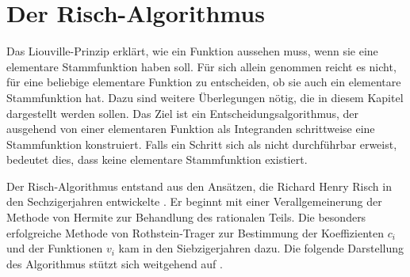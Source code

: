 %
%
%
\section{Der Risch-Algorithmus
\label{buch:intalg:section:risch}}
%
Das Liouville-Prinzip erklärt, wie ein Funktion aussehen muss, wenn sie
eine elementare Stammfunktion haben soll.
Für sich allein genommen reicht es nicht, für eine beliebige elementare
Funktion zu entscheiden, ob sie auch ein elementare Stammfunktion hat.
Dazu sind weitere Überlegungen nötig, die in diesem Kapitel dargestellt
werden sollen.
Das Ziel ist ein Entscheidungsalgorithmus, der ausgehend von einer
elementaren Funktion als Integranden schrittweise eine Stammfunktion
konstruiert.
Falls ein Schritt sich als nicht durchführbar erweist, bedeutet dies,
dass keine elementare Stammfunktion existiert.

Der Risch-Algorithmus entstand aus den Ansätzen, die Richard Henry Risch
in den Sechzigerjahren entwickelte \cite{buch:risch}.
Er beginnt mit einer Verallgemeinerung der Methode von Hermite zur
Behandlung des rationalen Teils.
Die besonders erfolgreiche Methode von Rothstein-Trager zur Bestimmung
der Koeffizienten $c_i$ und der Funktionen $v_i$ kam in den Siebzigerjahren
dazu.
Die folgende Darstellung des Algorithmus stützt sich weitgehend auf 
\cite{buch:algorithms}.





